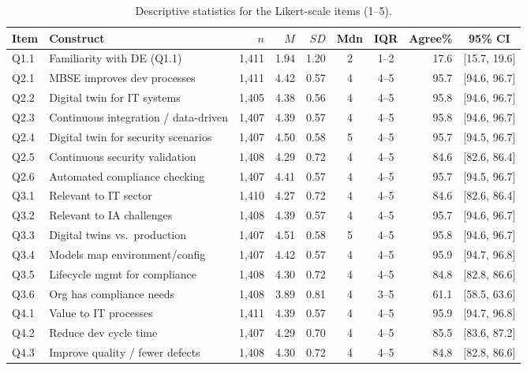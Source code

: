 \begin{table}[ht]
\centering
\caption{Descriptive statistics for the Likert-scale items (1--5).}
\label{tab:desc}
\small
\setlength{\tabcolsep}{4pt}
\begin{tabular}{@{}llrrrccrc@{}}
\toprule
Item & Construct & $n$ & $M$ & $SD$ & Mdn & IQR & Agree\% & 95\% CI \\
\midrule
Q1.1 & Familiarity with DE (Q1.1) & 1{,}411 & 1.94 & 1.20 & 2 & 1--2 & 17.6 & [15.7, 19.6] \\
Q2.1 & MBSE improves dev processes & 1{,}411 & 4.42 & 0.57 & 4 & 4--5 & 95.7 & [94.6, 96.7] \\
Q2.2 & Digital twin for IT systems & 1{,}405 & 4.38 & 0.56 & 4 & 4--5 & 95.8 & [94.6, 96.7] \\
Q2.3 & Continuous integration / data-driven & 1{,}407 & 4.39 & 0.57 & 4 & 4--5 & 95.8 & [94.6, 96.7] \\
Q2.4 & Digital twin for security scenarios & 1{,}407 & 4.50 & 0.58 & 5 & 4--5 & 95.7 & [94.5, 96.7] \\
Q2.5 & Continuous security validation & 1{,}408 & 4.29 & 0.72 & 4 & 4--5 & 84.6 & [82.6, 86.4] \\
Q2.6 & Automated compliance checking & 1{,}407 & 4.41 & 0.57 & 4 & 4--5 & 95.7 & [94.5, 96.7] \\
Q3.1 & Relevant to IT sector & 1{,}410 & 4.27 & 0.72 & 4 & 4--5 & 84.6 & [82.6, 86.4] \\
Q3.2 & Relevant to IA challenges & 1{,}408 & 4.39 & 0.57 & 4 & 4--5 & 95.7 & [94.6, 96.7] \\
Q3.3 & Digital twins vs.\ production & 1{,}407 & 4.51 & 0.58 & 5 & 4--5 & 95.8 & [94.6, 96.7] \\
Q3.4 & Models map environment/config & 1{,}407 & 4.42 & 0.57 & 4 & 4--5 & 95.9 & [94.7, 96.8] \\
Q3.5 & Lifecycle mgmt for compliance & 1{,}408 & 4.30 & 0.72 & 4 & 4--5 & 84.8 & [82.8, 86.6] \\
Q3.6 & Org has compliance needs & 1{,}408 & 3.89 & 0.81 & 4 & 3--5 & 61.1 & [58.5, 63.6] \\
Q4.1 & Value to IT processes & 1{,}411 & 4.39 & 0.57 & 4 & 4--5 & 95.9 & [94.7, 96.8] \\
Q4.2 & Reduce dev cycle time & 1{,}407 & 4.29 & 0.70 & 4 & 4--5 & 85.5 & [83.6, 87.2] \\
Q4.3 & Improve quality / fewer defects & 1{,}408 & 4.30 & 0.72 & 4 & 4--5 & 84.8 & [82.8, 86.6] \\

\end{tabular}
\end{table}

